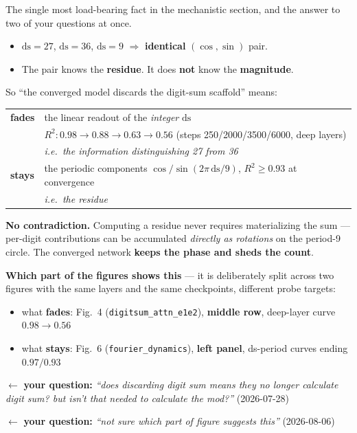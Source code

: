 \documentclass[11pt]{article}
\newcommand{\yourq}[2]{%
  \par\vspace{4pt}\noindent
  \textcolor{qcol}{$\leftarrow$ \textbf{your question:}
  \textit{``#1''}\; \textnormal{(#2)}}\par\vspace{4pt}}
\newcommand{\ds}{\mathrm{ds}}
\begin{document}
The single most load-bearing fact in the mechanistic section, and the answer to
two of your questions at once.

\begin{itemize}[leftmargin=*,itemsep=2pt]
\item $\ds = 27$, $\ds = 36$, $\ds = 9$ $\Rightarrow$ \textbf{identical} $(\cos,\sin)$ pair.
\item The pair knows the \textbf{residue}. It does \textbf{not} know the \textbf{magnitude}.
\end{itemize}

So ``the converged model discards the digit-sum scaffold'' means:

\begin{center}
\begin{tabular}{@{}ll@{}}
\toprule
\textbf{fades} & the linear readout of the \emph{integer} $\ds$ \\
& $R^2: 0.98 \to 0.88 \to 0.63 \to 0.56$ (steps 250/2000/3500/6000, deep layers) \\
& \emph{i.e.\ the information distinguishing 27 from 36} \\
\midrule
\textbf{stays} & the periodic components $\cos/\sin(2\pi\,\ds/9)$, $R^2 \ge 0.93$ at convergence \\
& \emph{i.e.\ the residue} \\
\bottomrule
\end{tabular}
\end{center}

\textbf{No contradiction.} Computing a residue never requires materializing the
sum --- per-digit contributions can be accumulated \emph{directly as rotations}
on the period-9 circle. The converged network \textbf{keeps the phase and sheds
the count}.

\textbf{Which part of the figures shows this} --- it is deliberately split across
two figures with the same layers and the same checkpoints, different probe targets:
\begin{itemize}[leftmargin=*,itemsep=1pt]
\item what \textbf{fades}: Fig.~4 (\texttt{digitsum\_attn\_e1e2}), \textbf{middle row},
deep-layer curve $0.98 \to 0.56$
\item what \textbf{stays}: Fig.~6 (\texttt{fourier\_dynamics}), \textbf{left panel},
ds-period curves ending $0.97 / 0.93$
\end{itemize}

\yourq{does discarding digit sum means they no longer calculate digit sum? but
isn't that needed to calculate the mod?}{2026-07-28}
\yourq{not sure which part of figure suggests this}{2026-08-06}
\end{document}
